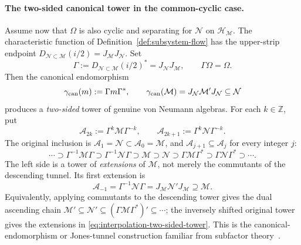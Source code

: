 \documentclass[a4paper,11pt]{article}
\theoremstyle{definition}
\newcommand{\mA}{\mathcal{A}}%
\newcommand{\mN}{\mathcal{N}}
\newcommand{\mH}{\mathcal{H}}
\newcommand{\mM}{\mathcal{M}}
\begin{document}
\paragraph{The two-sided canonical tower in the common-cyclic case.}
Assume now that $\Omega$ is also cyclic and separating for $\mN$
on $\mH_{\mM}$. The characteristic function of
Definition~\ref{def:subsystem-flow} has the upper-strip endpoint
$D_{\mN\subset\mM}(i/2)=J_{\mM}J_{\mN}$. Set
\begin{equation}
 \Gamma:=D_{\mN\subset\mM}(i/2)^*
 =J_{\mN}J_{\mM},\qquad \Gamma\Omega=\Omega.
 \label{eq:interpolation-Gamma}
\end{equation}
Then the canonical endomorphism
\begin{equation}
 \gamma_{\rm can}(m):=\Gamma m\Gamma^*,\qquad
 \gamma_{\rm can}(\mM)=J_{\mN}\mM'J_{\mN}\subseteq\mN
 \label{eq:interpolation-canonical-endomorphism}
\end{equation}
produces a \emph{two-sided} tower of genuine von Neumann algebras.
For each $k\in\mathbb Z$, put
\begin{equation}
 \mA_{2k}:=\Gamma^k\mM\Gamma^{-k},\qquad
 \mA_{2k+1}:=\Gamma^k\mN\Gamma^{-k}.
 \label{eq:interpolation-tower-levels}
\end{equation}
The original inclusion is $\mA_1=\mN\subset\mA_0=\mM$,
and $\mA_{j+1}\subseteq\mA_j$ for every integer $j$:
\begin{equation}
 \boxed{\quad
 \cdots\supset\Gamma^{-1}\mM\Gamma
 \supset\Gamma^{-1}\mN\Gamma
 \supset\mM\supset\mN
 \supset\Gamma\mM\Gamma^*\supset\Gamma\mN\Gamma^*
 \supset\cdots .\quad}
 \label{eq:interpolation-two-sided-tower}
\end{equation}
The left side is a tower of \emph{extensions} of $\mM$,
not merely the commutants of the descending tunnel. Its first extension
is
\begin{equation}
 \mA_{-1}=\Gamma^{-1}\mN\Gamma
 =J_{\mM}\mN'J_{\mM}\supseteq\mM.
 \label{eq:interpolation-first-extension}
\end{equation}
Equivalently, applying commutants to the descending tower gives the
dual ascending chain
$\mM'\subseteq\mN'\subseteq(\Gamma\mM\Gamma^*)'
\subseteq\cdots$; the inversely shifted original tower gives the
extensions in \eqref{eq:interpolation-two-sided-tower}. This is the
canonical-endomorphism or Jones-tunnel construction familiar from
subfactor theory~\cite{revolutionizing,GuidoLongoWiesbrock1998}.
\end{document}
